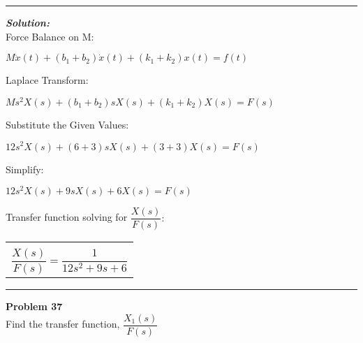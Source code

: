 \documentclass[11pt,letterpaper]{article}
\begin{document}
	\rule{\textwidth}{1pt}
\vspace{12pt}
\textit{\textbf{Solution:}}\\
Force Balance on M:\\
\begin{center}
	$M\ddot{x}(t)+(b_1+b_2)\dot{x}(t)+(k_1+k_2)x(t)=f(t)$\\
\end{center}
Laplace Transform:\\
\begin{center}
	$Ms^2X(s)+(b_1+b_2)sX(s)+(k_1+k_2)X(s)=F(s)$\\
\end{center}
Substitute the Given Values:\\
\begin{center}
	$12s^2X(s)+(6+3)sX(s)+(3+3)X(s)=F(s)$\\
\end{center}
Simplify:\\
\begin{center}
	$12s^2X(s)+9sX(s)+6X(s)=F(s)$\\
\end{center}
Transfer function solving for $\dfrac{X(s)}{F(s)}:$\\
\begin{center}
	\begin{tabular}{|c|}
		\hline \\
		$\dfrac{X(s)}{F(s)}=\dfrac{1}{12s^2+9s+6}$	\\ [12pt]
	\hline
	\end{tabular}	
\end{center}

\clearpage

\rule{\textwidth}{1pt}
\textbf{Problem 37}\\
Find the transfer function, $\dfrac{X_1(s)}{F(s)}$ \\
\end{document}
